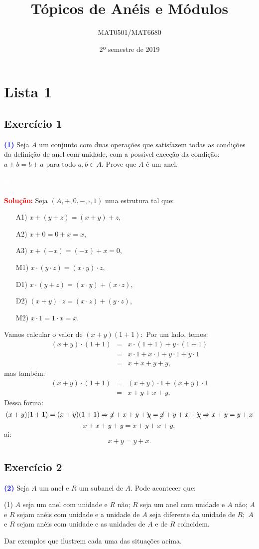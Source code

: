 \documentclass[11pt,a4paper]{article}
\title{Tópicos de Anéis e Módulos}
\author{MAT0501/MAT6680}
\date{2º semestre de 2019}
\newcommand{\exercicio}[1]{\subsection{Exercício #1} \textcolor{blue}{\bf(#1)}}
\newcommand{\dividiritens}[1]{\begin{tasks}[counter-format={(tsk[a])},label-width=3.6ex, label-format = {\bfseries}, column-sep = {0pt}](1) #1 \end{tasks}}
\newcommand{\pers}[1]{\textcolor{Floresta}{$\negrito{(#1)} $}}
\newcommand{\solucao}[1]{
\textbf{\textcolor{white}{oi}\\ \\ \textcolor{red}{Solução:}} #1}
\begin{document}
\maketitle
\tableofcontents
\newpage
\begin{comment}

\begin{center}
\large\textbf{\textcolor{Floresta}{Lista 1}}\\
\end{center}

\end{comment}

\section{\textcolor{Floresta}{Lista 1}}

\exercicio{1} Seja $A$ um conjunto com duas operações que satisfazem todas as condições da definição de anel com
unidade, com a possível exceção da condição: $a + b = b + a$ para todo $a, b \in A.$ Prove que $A$ é um anel.
\solucao{
Seja $(A,+,0,-,\cdot,1)$ uma estrutura tal que:
\begin{itemize}
\item[A1)] $x+(y+z)=(x+y)+z$,
\item[A2)] $x+0=0+x=x$,
\item[A3)] $x+(-x)=(-x)+x=0$,
\item[M1)] $x\cdot(y\cdot z)=(x\cdot y)\cdot z$,
\item[D1)] $x\cdot(y+z)=(x\cdot y)+(x\cdot z)$,
\item[D2)] $(x+y)\cdot z=(x\cdot z)+(y\cdot z)$,
\item[M2)] $x\cdot 1=1\cdot x=x$.
\end{itemize}

Vamos calcular o valor de $(x+y)(1+1):$
Por um lado, temos:
\[
\begin{array}{rcl}
(x+y)\cdot(1+1)&=& x\cdot(1+1)+y\cdot(1+1)\\&=&x\cdot 1+x\cdot 1+y\cdot 1+y\cdot 1\\&=&x+x+y+y,
\end{array}
\]
mas também:
\[
\begin{array}{rcl}
(x+y)\cdot(1+1)&=& (x+y)\cdot 1+(x+y)\cdot 1\\&=&x+y+x+y,
\end{array}
\]
Dessa forma:
\[
(x+y)(1+1) = (x+y)(1+1) \Rightarrow \cancel{x} + x + y + \bcancel{y} = \cancel{x} + y + x + \bcancel{y} \Rightarrow x + y = y + x
\]
\[
x+x+y+y=x+y+x+y,
\]
aí:
\[
x+y=y+x.
\]

}
\exercicio{2}
Seja $A$ um anel e $R$ um subanel de $A.$ Pode acontecer que:
\dividiritens{
\task[\pers{a}] $A$ seja um anel com unidade e $R$ não;
\task[\pers{b}] $R$ seja um anel com unidade e $A$ não;
\task[\pers{c}] $A$ e $R$ sejam anéis com unidade e a unidade de $A$ seja diferente da unidade de $R;$
\task[\pers{d}] $A$ e $R$ sejam anéis com unidade e as unidades de $A$ e de $R$ coincidem.
}
Dar exemplos que ilustrem cada uma das situações acima.
\end{document}
